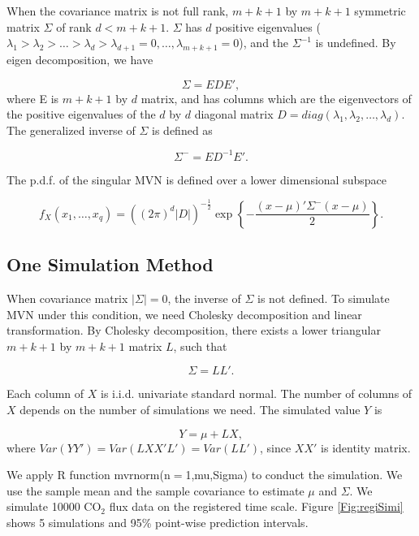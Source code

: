 \documentclass{article}\usepackage[]{graphicx}\usepackage[]{color}
\begin{document}
When the covariance matrix is not full rank, $m+k+1$ by $m+k+1$ symmetric matrix $\Sigma$ of rank $d<m+k+1$. $\Sigma$ has $d$ positive eigenvalues ($\lambda_1>\lambda_2>\dots>\lambda_d>\lambda_{d+1}=0,\dots,\lambda_{m+k+1}=0$), and the $\Sigma^{-1}$ is undefined. By eigen decomposition, we have

\begin{equation}
\Sigma = EDE',
\end{equation}
where E is $m+k+1$ by $d$ matrix, and has columns which are the eigenvectors of the positive eigenvalues of the $d$ by $d$ diagonal matrix $D=diag(\lambda_1,\lambda_2,\dots,\lambda_d)$. The generalized inverse of $\Sigma$ is defined as

\begin{equation}
\Sigma^{-} = ED^{-1}E'.
\end{equation}

The p.d.f. of the singular MVN is defined over a lower dimensional subspace

\begin{equation}
f_{X}(x_1,\dots,x_{q}) = ((2\pi)^d|D|)^{-\frac{1}{2}}\exp\left\{-\frac{(x-\mu)'\Sigma^{-}(x-\mu)}{2}\right\}.
\end{equation}  


\subsection{One Simulation Method}

When covariance matrix $|\Sigma|=0$, the inverse of $\Sigma$ is not defined. To simulate MVN under this condition, we need Cholesky decomposition and linear transformation. By Cholesky decomposition, there exists a lower triangular $m+k+1$ by $m+k+1$ matrix $L$, such that 

\begin{equation}
\Sigma=LL'.
\end{equation}

Each column of $X$ is i.i.d. univariate standard normal. The number of columns of $X$ depends on the number of simulations we need. The simulated value $Y$ is

\begin{equation}
Y = \mu + LX,
\end{equation}  
where $Var(YY')= Var(LXX'L') = Var(LL')$, since $XX'$ is identity matrix. 

We apply R function mvrnorm(n$=$1,mu,Sigma) to conduct the simulation. We use the sample mean and the sample covariance to estimate $\mu$ and $\Sigma$.
We simulate 10000 CO$_2$ flux data on the registered time scale. Figure \ref{Fig:regiSimi} shows 5 simulations and 95\% point-wise prediction intervals.
\end{document}
